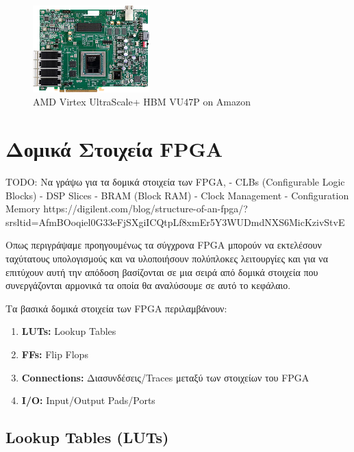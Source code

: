 \begin{figure}[h!]
  \centering
  \includegraphics[width=0.4\textwidth]{figures/chapter3/aws_fpga.png}
  \caption{AMD Virtex UltraScale+ HBM VU47P on Amazon}
  \label{fig:aws_fpga.png}
\end{figure}

\section{Δομικά Στοιχεία FPGA}
\label{sec:fpga_building_blocks}

TODO: Να γράψω για τα δομικά στοιχεία των FPGA,
- CLBs (Configurable Logic Blocks)
- DSP Slices
- BRAM (Block RAM)
- Clock Management
- Configuration Memory
https://digilent.com/blog/structure-of-an-fpga/?srsltid=AfmBOoqiel0G33eFjSXgiICQtpLf8xmEr5Y3WUDmdNXS6MicKzivStvE

Οπως περιγράψαμε προηγουμένως τα σύγχρονα FPGA μπορούν να εκτελέσουν ταχύτατους υπολογισμούς και να υλοποιήσουν πολύπλοκες λειτουργίες
και για να επιτύχουν αυτή την απόδοση βασίζονται σε μια σειρά από δομικά στοιχεία που συνεργάζονται αρμονικά τα οποία θα αναλύσουμε σε αυτό το κεφάλαιο.

Τα βασικά δομικά στοιχεία των FPGA περιλαμβάνουν:
\begin{enumerate}
  \item \textbf{LUTs:} Lookup Tables
  \item \textbf{FFs:} Flip Flops
  \item \textbf{Connections:} Διασυνδέσεις/Traces μεταξύ των στοιχείων του FPGA
  \item \textbf{I/O:} Input/Output Pads/Ports
\end{enumerate}

\subsection{Lookup Tables (LUTs)}

